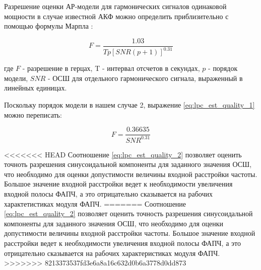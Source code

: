 Разрешение оценки АР-модели для гармонических сигналов одинаковой мощности в случае известной АКФ
можно определить приблизительно с помощью формулы Марпла \cite{marpl_book, kay_ar_book}:
\begin{center}
\begin{equation}
	\label{eq:lpc_est_quality_1}
	F = \frac{1.03}{Tp[SNR(p+1)]^{0.31}}
\end{equation}
\end{center}

где ${F}$ - разрешение в герцах, T - интервал отсчетов в секундах, ${p}$ - порядок модели,
${SNR}$ - ОСШ для отдельного гармонического сигнала, выраженный в линейных единицах.

Поскольку порядок модели в нашем случае 2, выражение \ref{eq:lpc_est_quality_1} можно переписать:
\begin{center}
\begin{equation}
	\label{eq:lpc_est_quality_2}
	F = \frac{0.36635}{SNR^{0.31}}
\end{equation}
\end{center}

<<<<<<< HEAD
Соотношение \ref{eq:lpc_est_quality_2} позволяет оценить точноть разрешения синусоидальной компоненты
для заданного значения ОСШ, что необходимо для оценки допустимости величины входной расстройки частоты.
Большое значение входной расстройки ведет к необходимости увеличения входной полосы ФАПЧ, а это
отрицательно сказывается на рабочих характетистиках модуля ФАПЧ.
=======
Соотношение \ref{eq:lpc_est_quality_2} позволяет оценить точность разрешения синусоидальной компоненты
для заданного значения ОСШ, что необходимо для оценки допустимости величины входной расстройки частоты.
Большое значение входной расстройки ведет к необходимости увеличения входной полосы ФАПЧ, а это
отрицательно сказывается на рабочих характеристиках модуля ФАПЧ.
>>>>>>> 8213373537fd3e6a8a16c632d0b6a3778d0dd873

\newpage
